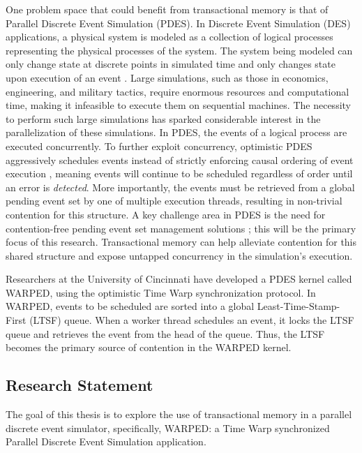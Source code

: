 \documentclass[a4paper]{article}
\begin{document}
\indent 
One problem space that could benefit from transactional memory is that of
Parallel Discrete Event Simulation (PDES).  In Discrete Event Simulation (DES)
applications, a physical system is modeled as a collection of logical processes
representing the physical processes of the system.  The system being modeled can
only change state at discrete points in simulated time and only changes state
upon execution of an event \cite{fujimoto}.  Large simulations, such as those in
economics, engineering, and military tactics, require enormous resources and
computational time, making it infeasible to execute them on sequential machines.
The necessity to perform such large simulations has sparked considerable
interest in the parallelization of these simulations.  In PDES, the events of a
logical process are executed concurrently.  To further exploit concurrency,
optimistic PDES aggressively schedules events instead of strictly enforcing
causal ordering of event execution \cite{fujimoto,dickman_thesis}, meaning
events will continue to be scheduled regardless of order until an error is
\textit{detected}.  More importantly, the events must be retrieved from a global
pending event set by one of multiple execution threads, resulting in non-trivial
contention for this structure.  A key challenge area in PDES is the need for
contention-free pending event set management solutions \cite{dickman}; this will
be the primary focus of this research. Transactional memory can help alleviate
contention for this shared structure and expose untapped concurrency in the
simulation's execution.
\par

\indent
Researchers at the University of Cincinnati have developed a PDES kernel called
WARPED, using the optimistic Time Warp synchronization protocol.  In WARPED,
events to be scheduled are sorted into a global Least-Time-Stamp-First (LTSF)
queue.  When a worker thread schedules an event, it locks the LTSF queue and
retrieves the event from the head of the queue.  Thus, the LTSF becomes the
primary source of contention in the WARPED kernel. 
\par

\subsection{\textbf{Research Statement}}

\indent 
The goal of this thesis is to explore the use of transactional memory in
a parallel discrete event simulator, specifically, WARPED: a Time
Warp synchronized Parallel Discrete Event Simulation application.
\par
\end{document}
